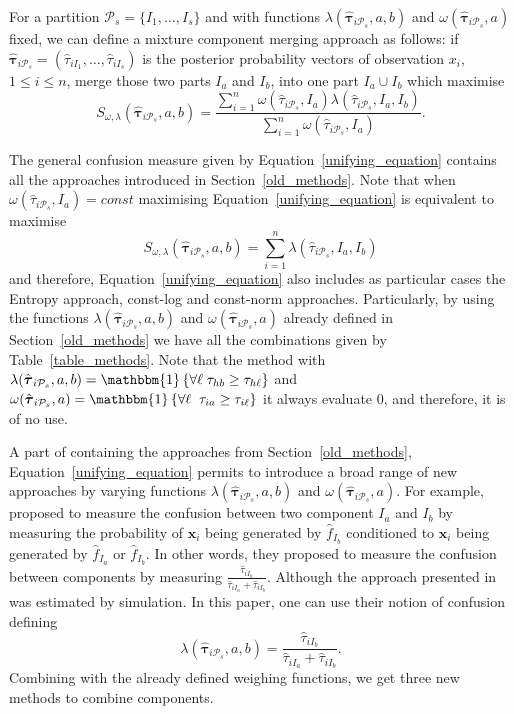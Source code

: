 \documentclass[10pt, a4paper]{article}
\newcommand{\m}[1]{\boldsymbol{#1}}
\begin{document}
\begin{spacing}{1.9}
For a partition $\mathcal{P}_s = \{ I_1, \dots, I_s\}$ and with  functions $\lambda(\hat{\m \tau}_{i \mathcal{P}_s}, a, b)$ and $\omega(\hat{\m \tau}_{i \mathcal{P}_s}, a)$ fixed, we can define a mixture component merging approach as follows: if $\hat{\m\tau}_{i \mathcal{P}_s} = \left( \hat{\tau}_{i I_1} , \dots, \hat{\tau}_{i I_s}  \right)$ is the posterior probability vectors of observation $x_i$, $1 \leq i \leq n$,  merge those two parts $I_a$ and $I_b$, into one part $I_a \cup I_b$ which maximise
\begin{equation}\label{unifying_equation}
S_{\omega, \lambda}( \hat{\m \tau}_{i \mathcal{P}_s}, a, b) = \frac{\sum_{i=1}^n \omega(\hat{\tau}_{i \mathcal{P}_s}, I_a) \lambda(\hat{\tau}_{i \mathcal{P}_s}, I_a, I_b)}{\sum_{i=1}^n \omega(\hat{\tau}_{i \mathcal{P}_s}, I_a) }.
\end{equation}


The general confusion measure given by Equation~\ref{unifying_equation} contains all the approaches introduced in Section~\ref{old_methods}. Note that when $\omega(\hat{\tau}_{i \mathcal{P}_s}, I_a) = const$ maximising Equation~\ref{unifying_equation} is equivalent to maximise
\[
S_{\omega, \lambda}( \hat{\m \tau}_{i \mathcal{P}_s}, a, b) = \sum_{i=1}^n \lambda(\hat{\tau}_{i \mathcal{P}_s}, I_a, I_b)
\]
and therefore, Equation~\ref{unifying_equation} also includes as particular cases the Entropy approach, const-log and const-norm approaches. Particularly, by using the functions $\lambda(\hat{\m \tau}_{i \mathcal{P}_s}, a, b)$ and $\omega(\hat{\m \tau}_{i \mathcal{P}_s}, a)$ already defined in Section~\ref{old_methods} we have all the combinations given by Table~\ref{table_methods}. Note that the method with $\lambda(\hat{\m \tau}_{i \mathcal{P}_s}, a, b) =  \mathlarger{\mathbbm{1}}\left\{  \forall \ell \; \tau_{hb} \geq \tau_{h\ell}  \right\}$ and  $\omega(\hat{\m \tau}_{i \mathcal{P}_s}, a) = \mathlarger{\mathbbm{1}}\left\{  \forall \ell\; \; \tau_{ia} \geq \tau_{i\ell}  \right\}$ it always evaluate 0, and therefore, it is of no use.

A part of containing the approaches from Section~\ref{old_methods}, Equation~\ref{unifying_equation} permits to introduce a broad range of new approaches by varying functions $\lambda(\hat{\m \tau}_{i \mathcal{P}_s}, a, b)$ and $\omega(\hat{\m \tau}_{i \mathcal{P}_s}, a)$. For example, \cite{longford2014} proposed to measure the confusion between two component $I_a$ and $I_b$ by measuring the probability of $\m x_i$ being generated by $\hat{f}_{I_b}$ conditioned to $\m x_i$  being generated by $\hat{f}_{I_a}$ or $\hat{f}_{I_b}$. In other words, they proposed to measure the confusion between components by measuring $\frac{\hat{\tau}_{iI_b}}{\hat{\tau}_{iI_a} + \hat{\tau}_{iI_b}}$. Although the approach presented in \cite{longford2014} was estimated by simulation. In this paper, one can use their notion of confusion defining
\[\lambda(\hat{\m \tau}_{i \mathcal{P}_s}, a, b) = \frac{\hat{\tau}_{iI_b}}{\hat{\tau}_{iI_a} + \hat{\tau}_{iI_b}}.\]
Combining with the already defined weighing functions, we get three new methods to combine components. 


\end{spacing}
\end{document}
